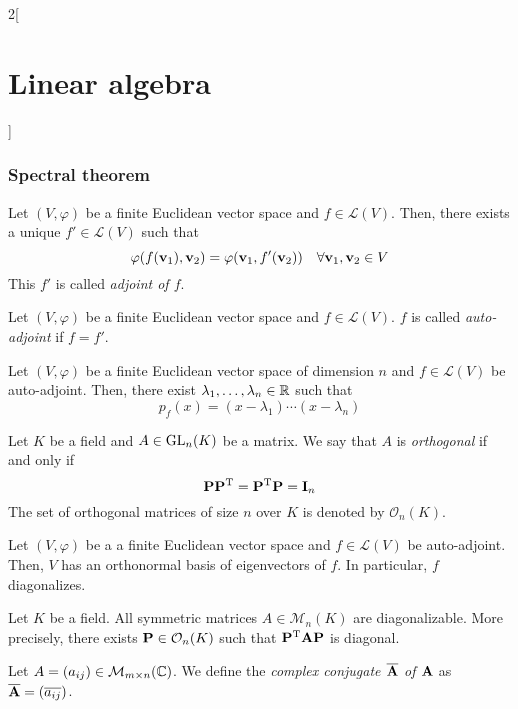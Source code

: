 \documentclass[../../../main.tex]{subfiles}
\begin{document}
\begin{multicols}{2}[\section{Linear algebra}]
  \subsubsection{Spectral theorem}
  \begin{definition}
    Let $(V,\varphi)$ be a finite Euclidean vector space and $f\in\mathcal{L}(V)$. Then, there exists a unique $f'\in\mathcal{L}(V)$ such that $$\varphi(f(\boldsymbol{\mathrm{v}}_1),\boldsymbol{\mathrm{v}}_2)=\varphi(\boldsymbol{\mathrm{v}}_1,f'(\boldsymbol{\mathrm{v}}_2))\quad\forall \boldsymbol{\mathrm{v}}_1,\boldsymbol{\mathrm{v}}_2\in V$$ This $f'$ is called \textit{adjoint of $f$}.
  \end{definition}
  \begin{definition}
    Let $(V,\varphi)$ be a finite Euclidean vector space and $f\in\mathcal{L}(V)$. $f$ is called \textit{auto-adjoint} if $f=f'$.
  \end{definition}
  \begin{lemma}
    Let $(V,\varphi)$ be a finite Euclidean vector space of dimension $n$ and $f\in\mathcal{L}(V)$ be auto-adjoint. Then, there exist $\lambda_1,\ldots,\lambda_n\in\mathbb{R}$ such that $$p_f(x)=(x-\lambda_1 )\cdots(x-\lambda_n)$$
  \end{lemma}
  \begin{definition}
    Let $K$ be a field and $A\in\mathrm{GL}_n(K)$ be a matrix. We say that $A$ is \textit{orthogonal} if and only if $$\boldsymbol{\mathrm{P}}\vb{P}^{\mathrm{T}}=\vb{P}^{\mathrm{T}}\boldsymbol{\mathrm{P}}=\boldsymbol{\mathrm{I}}_n$$ The set of orthogonal matrices of size $n$ over $K$ is denoted by $\mathcal{O}_n(K)$.
  \end{definition}
  \begin{theorem}
    Let $(V,\varphi)$ be a a finite Euclidean vector space and $f\in\mathcal{L}(V)$ be auto-adjoint. Then, $V$ has an orthonormal basis of eigenvectors of $f$. In particular, $f$ diagonalizes.
  \end{theorem}
  \begin{corollary}
    Let $K$ be a field. All symmetric matrices $A\in\mathcal{M}_n(K)$ are diagonalizable. More precisely, there exists $\boldsymbol{\mathrm{P}}\in\mathcal{O}_n(K)$ such that $\vb{P}^{\mathrm{T}}\boldsymbol{\mathrm{A}}\boldsymbol{\mathrm{P}}$ is diagonal.
  \end{corollary}
  \begin{definition}
    Let $A=(a_{ij})\in\mathcal{M}_{m\times n}(\mathbb{C})$. We define the \textit{complex conjugate $\overline{\boldsymbol{\mathrm{A}}}$ of $\boldsymbol{\mathrm{A}}$} as $\overline{\boldsymbol{\mathrm{A}}}=(\overline{a_{ij}})$.

\end{definition}
\end{multicols}
\end{document}
